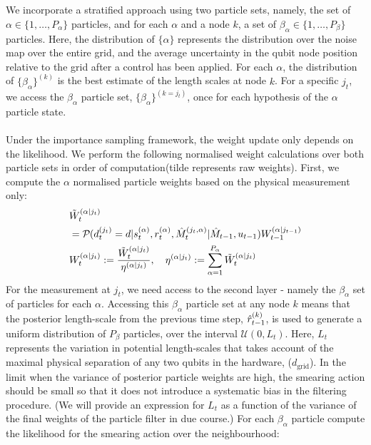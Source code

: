 \\
\\
We incorporate a stratified approach using two particle sets, namely, the set of $\alpha \in \{1, \hdots ,P_\alpha\}$ particles, and for each $\alpha$ and a node $k$, a set of $\beta_\alpha \in \{1, \hdots ,P_\beta\}$ particles. Here, the distribution of $\{\alpha \}$  represents the distribution over the noise map over the entire grid, and the average uncertainty in the qubit node position relative to the grid after a control has been applied. For each $\alpha$, the distribution of $\{ \beta_\alpha \}^{(k)} $ is the best estimate of the length scales at node $k$. For a specific $j_t$, we access the $\beta_\alpha$ particle set, $\{ \beta_\alpha \}^{(k=j_t)} $, once for each hypothesis of the $\alpha$ particle state. \\
\\
Under the importance sampling framework, the weight update only depends on the likelihood. We perform the following normalised weight calculations over both particle sets in order of computation(tilde represents raw weights). First, we compute the $\alpha$ normalised particle weights based on the physical measurement only:
\begin{align}
&\tilde{W}_t^{( \alpha | j_t)} \nonumber \\
& = \mathcal{P}_{} ( d^{( j_t )}_{t}=d | s_{ t}^{(\alpha)}, r_{ t}^{(\alpha)}, \hat{M}_t^{(j_t, \alpha)}| \hat{M}_{t-1}, u_{t-1 } ) W_{t-1}^{( \alpha | j_{t-1})}  \label{eqn:slam:PF:4:alpha:raw}\\
&W_t^{( \alpha | j_t)} := \frac{\tilde{W}_t^{( \alpha | j_t)}}{\eta^{( \alpha | j_t)}}, \quad \eta^{( \alpha | j_t)} := \sum_{\alpha = 1}^{P_{\alpha}} \tilde{W}_t^{( \alpha | j_t)}  \label{eqn:slam:PF:5:alpha:norm}
\end{align} For the measurement at $j_t$, we need access to the second layer - namely the $\beta_\alpha$ set of particles for each $\alpha$.  Accessing this $\beta_\alpha$ particle set at any node $k$ means that the posterior length-scale from the previous time step, $\hat{r}^{( k )}_{t-1}$, is used to generate a uniform distribution of  $P_\beta$ particles, over the interval $\mathcal{U}(0, L_t)$. Here, $L_t$ represents the variation in potential length-scales that takes account of the maximal physical separation of any two qubits in the hardware, ($d_{\mathrm{grid}}$). In the limit when the variance of posterior particle weights are high, the smearing action should be small so that it does not introduce a systematic bias in the filtering procedure. (We will provide an expression for $L_t$ as a function of the variance of the final weights of the particle filter in due course.) For each $\beta_\alpha$ particle compute the likelihood for the smearing action over the neighbourhood:
